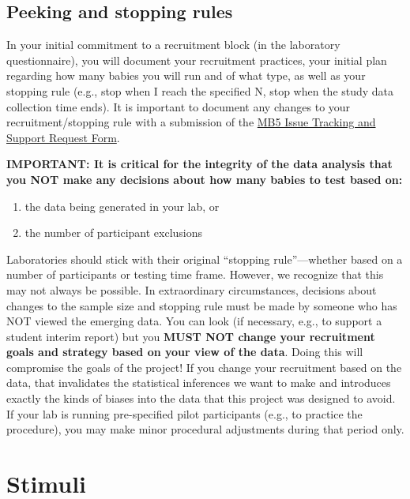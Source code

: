 \documentclass[
  letterpaper,
  DIV=11,
  numbers=noendperiod,
  oneside]{scrreprt}
\providecommand{\tightlist}{%
  \setlength{\itemsep}{0pt}\setlength{\parskip}{0pt}}
\begin{document}
\section{Peeking and stopping rules}\label{peeking-and-stopping-rules}

In your initial commitment to a recruitment block (in the laboratory
questionnaire), you will document your recruitment practices, your
initial plan regarding how many babies you will run and of what type, as
well as your stopping rule (e.g., stop when I reach the specified N,
stop when the study data collection time ends). It is important to
document any changes to your recruitment/stopping rule with a submission
of the
\href{https://airtable.com/appRoqMKzcK3NsXt4/pagGafhoHcuVMs7ZV/form}{MB5
Issue Tracking and Support Request Form}.

\textbf{IMPORTANT: It is critical for the integrity of the data analysis
that you NOT make any decisions about how many babies to test based on:}

\begin{enumerate}
\def\labelenumi{\arabic{enumi}.}
\tightlist
\item
  the data being generated in your lab, or
\item
  the number of participant exclusions
\end{enumerate}

Laboratories should stick with their original ``stopping
rule''---whether based on a number of participants or testing time
frame. However, we recognize that this may not always be possible. In
extraordinary circumstances, decisions about changes to the sample size
and stopping rule must be made by someone who has NOT viewed the
emerging data. You can look (if necessary, e.g., to support a student
interim report) but you \textbf{MUST NOT change your recruitment goals
and strategy based on your view of the data}. Doing this will compromise
the goals of the project! If you change your recruitment based on the
data, that invalidates the statistical inferences we want to make and
introduces exactly the kinds of biases into the data that this project
was designed to avoid. If your lab is running pre-specified pilot
participants (e.g., to practice the procedure), you may make minor
procedural adjustments during that period only.

\chapter{Stimuli}\label{sec-stimuli}
\end{document}
